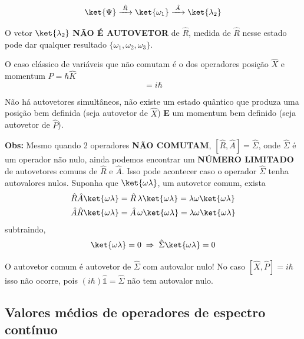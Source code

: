 \begin{equation}
    \ket{\Psi} \xrightarrow{\;\hat{R}\;} \ket{\omega_1} \xrightarrow{\;\hat{A}\;} \ket{\lambda_2}
\label{eq:aula12_sequencia_incompativel}
\end{equation}

O vetor $\ket{\lambda_2}$ \textbf{NÃO É AUTOVETOR} de $\hat{R}$, medida de $\hat{R}$ nesse estado pode dar qualquer resultado $\{\omega_1, \omega_2, \omega_3\}$.

O caso clássico de variáveis que não comutam é o dos operadores posição $\hat{X}$ e momentum $\hat{P} = \hbar\hat{K}$
\begin{equation}
    [\hat{X}, \hat{P}] = i\hbar
\label{eq:aula12_comutador_XP}
\end{equation}

Não há autovetores simultâneos, não existe um estado quântico que produza uma posição bem definida (seja autovetor de $\hat{X}$) \textbf{E} um momentum bem definido (seja autovetor de $\hat{P}$).

\noindent\textbf{Obs:} Mesmo quando 2 operadores \textbf{NÃO COMUTAM}, $[\hat{R},\hat{A}] = \hat{\Sigma}$, onde $\hat{\Sigma}$ é um operador não nulo, ainda podemos encontrar um \textbf{NÚMERO LIMITADO} de autovetores comuns de $\hat{R}$ e $\hat{A}$. Isso pode acontecer caso o operador $\hat{\Sigma}$ tenha autovalores nulos. Suponha que $\ket{\omega\lambda}$, um autovetor comum, exista
\begin{align}
    \hat{R}\hat{A}\ket{\omega\lambda} &= \hat{R}\,\lambda\ket{\omega\lambda} = \lambda\omega\ket{\omega\lambda} \notag \\
    \hat{A}\hat{R}\ket{\omega\lambda} &= \hat{A}\,\omega\ket{\omega\lambda} = \lambda\omega\ket{\omega\lambda}
\label{eq:aula12_autovetor_comum_naocomutam}
\end{align}
subtraindo,
\begin{equation}
    [\hat{R},\hat{A}]\ket{\omega\lambda} = 0 \;\Rightarrow\; \hat{\Sigma}\ket{\omega\lambda} = 0
\label{eq:aula12_subtraindo_comutador}
\end{equation}

O autovetor comum é autovetor de $\hat{\Sigma}$ com autovalor nulo! No caso $[\hat{X},\hat{P}] = i\hbar$ isso não ocorre, pois $(i\hbar)\hat{\mathbb{1}} = \hat{\Sigma}$ não tem autovalor nulo.

\subsection*{Valores médios de operadores de espectro contínuo}

